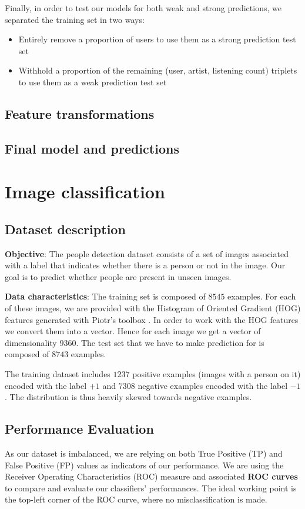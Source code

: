 \documentclass{article}
\begin{document}
  Finally, in order to test our models for both weak and strong predictions, we separated the training set in two ways:
  \begin{itemize}
    \item Entirely remove a proportion of users to use them as a strong prediction test set
    \item Withhold a proportion of the remaining (user, artist, listening count) triplets to use them as a weak prediction test set
  \end{itemize}

  \subsection{Feature transformations}

  \subsection{Final model and predictions}



\section{Image classification}

  \subsection{Dataset description}
  \textbf{Objective}: The people detection dataset consists of a set of images associated with a label that indicates whether there is a person or not in the image. Our goal is to predict whether people are present in unseen images.

  \textbf{Data characteristics}: The training set is composed of $8545$ examples. For each of these images, we are provided with the Histogram of Oriented Gradient (HOG) features generated with Piotr's toolbox \cite{piotrtoolbox}. In order to work with the HOG features we convert them into a vector. Hence for each image we get a vector of dimensionality $9360$. The test set that we have to make prediction for is composed of $8743$ examples.

  The training dataset includes $1237$ positive examples (images with a person on it) encoded with the label $+1$ and $7308$ negative examples encoded with the label $-1$. The distribution is thus heavily skewed towards negative examples.

  \subsection{Performance Evaluation}
  As our dataset is imbalanced, we are relying on both True Positive (TP) and False Positive (FP) values as indicators of our performance. We are using the Receiver Operating Characteristics (ROC) measure and associated \textbf{ROC curves} \cite{rocanalysis} to compare and evaluate our classifiers' performances. The ideal working point is the top-left corner of the ROC curve, where no misclassification is made.
\end{document}
